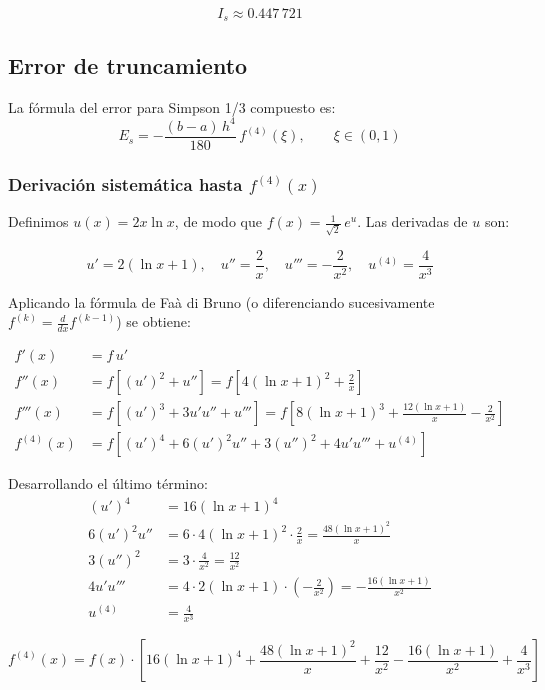 \documentclass[12pt,a4paper]{article}
\begin{document}
\[
  \boxed{I_s \approx 0.447\,721}
\]

\subsection*{Error de truncamiento}

La f\'ormula del error para Simpson 1/3 compuesto es:
\[
  E_s = -\frac{(b-a)\,h^4}{180}\,f^{(4)}(\xi), \qquad \xi \in (0,1)
\]

\subsubsection*{Derivaci\'on sistem\'atica hasta $f^{(4)}(x)$}

Definimos $u(x)=2x\ln x$, de modo que $f(x)=\tfrac{1}{\sqrt{2}}\,e^{u}$.
Las derivadas de $u$ son:

\[
  u'  = 2(\ln x+1), \quad
  u'' = \frac{2}{x}, \quad
  u'''= -\frac{2}{x^2}, \quad
  u^{(4)} = \frac{4}{x^3}
\]

Aplicando la f\'ormula de Fa\`a di Bruno (o diferenciando sucesivamente
$f^{(k)} = \tfrac{d}{dx}f^{(k-1)}$) se obtiene:

\begin{align*}
  f'(x)   &= f\,u' \\
  f''(x)  &= f\!\left[(u')^2 + u''\right]
           = f\!\left[4(\ln x+1)^2+\tfrac{2}{x}\right] \\
  f'''(x) &= f\!\left[(u')^3 + 3u'u'' + u'''\right]
           = f\!\left[8(\ln x+1)^3+\tfrac{12(\ln x+1)}{x}-\tfrac{2}{x^2}\right] \\
  f^{(4)}(x) &= f\!\left[(u')^4+6(u')^2 u''+3(u'')^2+4u'u'''+u^{(4)}\right]
\end{align*}

Desarrollando el \'ultimo t\'ermino:
\begin{align*}
  (u')^4   &= 16(\ln x+1)^4 \\
  6(u')^2 u'' &= 6\cdot 4(\ln x+1)^2\cdot\tfrac{2}{x} = \tfrac{48(\ln x+1)^2}{x} \\
  3(u'')^2 &= 3\cdot\tfrac{4}{x^2} = \tfrac{12}{x^2} \\
  4u'u'''  &= 4\cdot 2(\ln x+1)\cdot\!\left(-\tfrac{2}{x^2}\right)
            = -\tfrac{16(\ln x+1)}{x^2} \\
  u^{(4)}  &= \tfrac{4}{x^3}
\end{align*}

\[
  f^{(4)}(x) = f(x)\cdot\left[
    16(\ln x+1)^4
    +\frac{48(\ln x+1)^2}{x}
    +\frac{12}{x^2}
    -\frac{16(\ln x+1)}{x^2}
    +\frac{4}{x^3}
  \right]
\]
\end{document}
